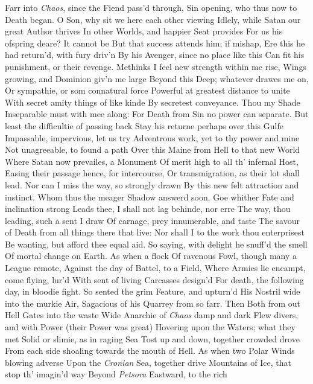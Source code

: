 \documentclass[11pt]{book}
\begin{document}
Farr into \textit{Chaos}, since the Fiend pass'd through, 
Sin opening, who thus now to Death began. 
\quad O Son, why sit we here each other viewing 
Idlely, while Satan our great Author thrives 
In other Worlds, and happier Seat provides 
For us his ofspring deare?  It cannot be 
But that success attends him; if mishap, 
Ere this he had return'd, with fury driv'n 
By his Avenger, since no place like this 
Can fit his punishment, or their revenge. 
Methinks I feel new strength within me rise, 
Wings growing, and Dominion giv'n me large 
Beyond this Deep; whatever drawes me on, 
Or sympathie, or som connatural force 
Powerful at greatest distance to unite 
With secret amity things of like kinde 
By secretest conveyance.  Thou my Shade 
Inseparable must with mee along: 
For Death from Sin no power can separate. 
But least the difficultie of passing back 
Stay his returne perhaps over this Gulfe 
Impassable, impervious, let us try 
Adventrous work, yet to thy power and mine 
Not unagreeable, to found a path 
Over this Maine from Hell to that new World 
Where Satan now prevailes, a Monument 
Of merit high to all th' infernal Host, 
Easing their passage hence, for intercourse, 
Or transmigration, as their lot shall lead. 
Nor can I miss the way, so strongly drawn 
By this new felt attraction and instinct. 
\quad Whom thus the meager Shadow answerd soon. 
Goe whither Fate and inclination strong 
Leads thee, I shall not lag behinde, nor erre 
The way, thou leading, such a sent I draw 
Of carnage, prey innumerable, and taste 
The savour of Death from all things there that live: 
Nor shall I to the work thou enterprisest 
Be wanting, but afford thee equal aid. 
\quad So saying, with delight he snuff'd the smell 
Of mortal change on Earth.  As when a flock 
Of ravenous Fowl, though many a League remote, 
Against the day of Battel, to a Field, 
Where Armies lie encampt, come flying, lur'd 
With sent of living Carcasses design'd 
For death, the following day, in bloodie fight. 
So sented the grim Feature, and upturn'd 
His Nostril wide into the murkie Air, 
Sagacious of his Quarrey from so farr. 
Then Both from out Hell Gates into the waste 
Wide Anarchie of \textit{Chaos} damp and dark 
Flew divers, and with Power (their Power was great) 
Hovering upon the Waters; what they met 
Solid or slimie, as in raging Sea 
Tost up and down, together crowded drove 
From each side shoaling towards the mouth of Hell. 
As when two Polar Winds blowing adverse 
Upon the \textit{Cronian} Sea, together drive 
Mountains of Ice, that stop th' imagin'd way 
Beyond \textit{Petsora} Eastward, to the rich 
\end{document}
